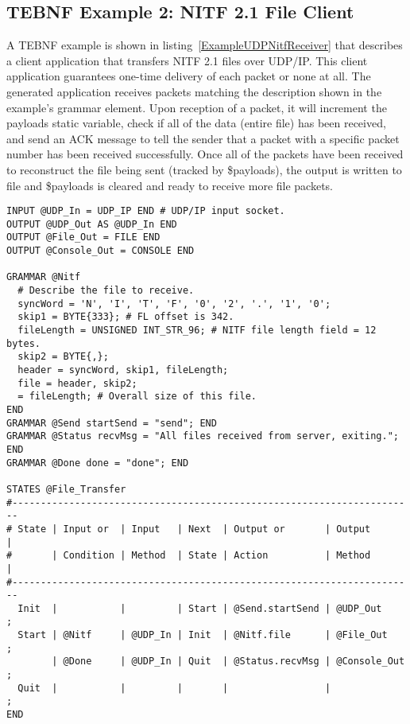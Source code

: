 \subsection{TEBNF Example 2: NITF 2.1 File Client}
A TEBNF example is shown in listing~\ref{ExampleUDPNitfReceiver} that describes a client application that transfers NITF 2.1 files over UDP/IP.  This client application guarantees one-time delivery of each packet or none at all.  The generated application receives packets matching the description shown in the example’s grammar element.  Upon reception of a packet, it will increment the payloads static variable, check if all of the data (entire file) has been received, and send an ACK message to tell the sender that a packet with a specific packet number has been received successfully.  Once all of the packets have been received to reconstruct the file being sent (tracked by \$payloads), the output is written to file and \$payloads is cleared and ready to receive more file packets.
\begin{lstlisting}[basicstyle=\small,caption={TEBNF grammar describing a UDP NITF 2.1 file transfer client.},label=ExampleUDPNitfReceiver]
INPUT @UDP_In = UDP_IP END # UDP/IP input socket.
OUTPUT @UDP_Out AS @UDP_In END
OUTPUT @File_Out = FILE END
OUTPUT @Console_Out = CONSOLE END

GRAMMAR @Nitf
  # Describe the file to receive.
  syncWord = 'N', 'I', 'T', 'F', '0', '2', '.', '1', '0';
  skip1 = BYTE{333}; # FL offset is 342.
  fileLength = UNSIGNED INT_STR_96; # NITF file length field = 12 bytes.
  skip2 = BYTE{,};
  header = syncWord, skip1, fileLength;
  file = header, skip2;
  = fileLength; # Overall size of this file.
END
GRAMMAR @Send startSend = "send"; END
GRAMMAR @Status recvMsg = "All files received from server, exiting."; END
GRAMMAR @Done done = "done"; END

STATES @File_Transfer
#-----------------------------------------------------------------------
# State | Input or  | Input   | Next  | Output or       | Output       |
#       | Condition | Method  | State | Action          | Method       |
#-----------------------------------------------------------------------
  Init  |           |         | Start | @Send.startSend | @UDP_Out     ;
  Start | @Nitf     | @UDP_In | Init  | @Nitf.file      | @File_Out    ;
        | @Done     | @UDP_In | Quit  | @Status.recvMsg | @Console_Out ;
  Quit  |           |         |       |                 |              ;
END
\end{lstlisting}

